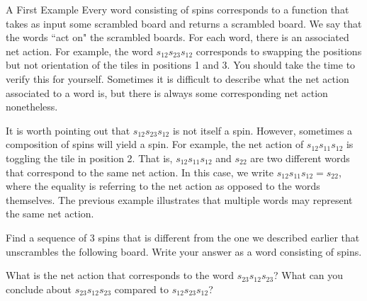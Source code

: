 \begin{section}{A First Example}
Every word consisting of spins corresponds to a function that takes as input some scrambled board and returns a scrambled board. We say that the words ``act on" the scrambled boards. For each word, there is an associated net action. For example, the word $s_{12} s_{23} s_{12}$ corresponds to swapping the positions but not orientation of the tiles in positions 1 and 3.  You should take the time to verify this for yourself. Sometimes it is difficult to describe what the net action associated to a word is, but there is always some corresponding net action nonetheless.

It is worth pointing out that $s_{12} s_{23} s_{12}$ is not itself a spin.  However, sometimes a composition of spins will yield a spin.  For example, the net action of $s_{12} s_{11} s_{12}$ is toggling the tile in position 2.  That is, $s_{12} s_{11} s_{12}$ and $s_{22}$ are two different words that correspond to the same net action. In this case, we write $s_{12} s_{11} s_{12}=s_{22}$, where the equality is referring to the net action as opposed to the words themselves. The previous example illustrates that multiple words may represent the same net action. 

\begin{problem}\label{prob:3_different_spins}
Find a sequence of 3 spins that is different from the one we described earlier that unscrambles the following board. Write your answer as a word consisting of spins.
\begin{center}
\end{center}
\end{problem}

\begin{problem}
What is the net action that corresponds to the word $s_{23} s_{12} s_{23}$? What can you conclude about $s_{23} s_{12} s_{23}$ compared to 
$s_{12} s_{23} s_{12}$?
\end{problem}


\end{section}
